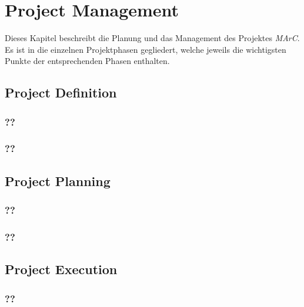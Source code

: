\section{Project Management} \label{sec:pm}

Dieses Kapitel beschreibt die Planung und das Management des Projektes \textit{MArC}. Es ist in die einzelnen Projektphasen gegliedert, welche jeweils die wichtigsten Punkte der entsprechenden Phasen enthalten.

\subsection{Project Definition} \label{sec:Projectdefinition}

\subsubsection{??}\label{sec:??}

\subsubsection{??}\label{sec:??}



\subsection{Project Planning} \label{sec:ProjectPlanning}

\subsubsection{??}\label{sec:??}

\subsubsection{??}\label{sec:??}




\subsection{Project Execution} \label{sec:ProjectExecution}

\subsubsection{??}\label{sec:??}

